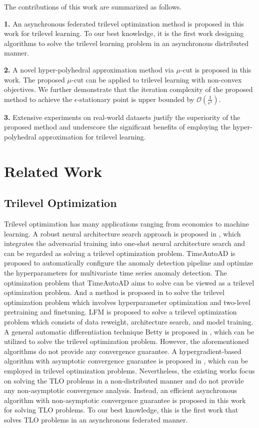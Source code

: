 \documentclass[letterpaper]{article} %
\begin{document}
The contributions of this work are summarized as follows.

\textbf{1.} An asynchronous federated trilevel optimization method is proposed in this work for trilevel learning. To our best knowledge, it is the first work designing algorithms to solve the trilevel learning problem in an asynchronous distributed manner.


\textbf{2.} A novel hyper-polyhedral approximation method via  $\mu$-cut is proposed in this work. The proposed $\mu$-cut can be applied to trilevel learning with non-convex objectives. We further demonstrate that the iteration complexity of the proposed method to achieve the $\epsilon$-stationary point is upper bounded by $\mathcal{O}(\frac{1}{\epsilon^2})$.


\textbf{3.} Extensive experiments on real-world datasets justify the superiority of the proposed method and underscore the significant benefits of employing the hyper-polyhedral approximation for trilevel learning.

\section{Related Work}
\subsection{Trilevel Optimization}
Trilevel optimization has many applications ranging from economics to machine learning. A robust neural architecture search approach is proposed in \cite{guo2020meets}, which integrates the adversarial training into one-shot neural architecture search and can be regarded as solving a trilevel optimization problem. TimeAutoAD \cite{jiao2022timeautoad} is proposed to automatically configure the anomaly detection pipeline and optimize the hyperparameters for multivariate time series anomaly detection. The optimization problem that TimeAutoAD aims to solve can be viewed as a trilevel optimization problem. And a method is proposed in \cite{raghu2021meta} to solve the trilevel optimization problem which involves hyperparameter optimization and two-level pretraining and finetuning. LFM \cite{garg2022learning} is proposed to solve a trilevel optimization problem which consists of data reweight, architecture search, and model training. A general automatic differentiation technique Betty is proposed in \cite{choe2022betty}, which can be utilized to solve the trilevel optimization problem. However, the aforementioned algorithms do not provide any convergence guarantee. A hypergradient-based algorithm with asymptotic convergence guarantee is proposed in \cite{sato2021gradient}, which can be employed in trilevel optimization problems. Nevertheless, the existing works focus on solving the TLO problems in a non-distributed manner and do not provide any non-asymptotic convergence analysis. Instead, an efficient asynchronous algorithm with non-asymptotic convergence guarantee is proposed in this work for solving TLO problems. To our best knowledge, this is the first work that solves TLO problems in an asynchronous federated manner.
\end{document}
